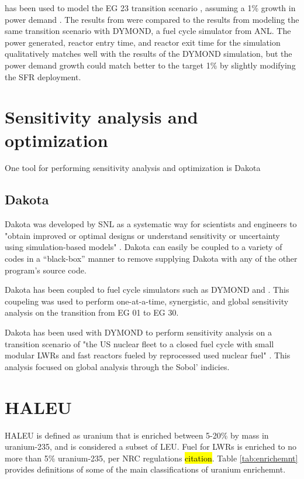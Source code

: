 \Cyclus has been used to model the EG 23 transition scenario 
\cite{wigeland_nuclear_2014}, assuming a 1\% growth in power demand 
\cite{djokic_application_2015}. The results from \Cyclus were compared 
to the results from modeling the same transition scenario with DYMOND, 
a fuel cycle simulator from \gls{ANL}. The power generated, reactor entry 
time, and reactor exit time for the \Cyclus simulation qualitatively 
matches well with the results of the DYMOND simulation, but the power 
demand growth could match better to the target 1\% by slightly modifying 
the \gls{SFR} deployment. 

\section{Sensitivity analysis and optimization}

One tool for performing sensitivity analysis and optimization is 
Dakota \cite{adams_dakota_2019}

\subsection{Dakota}
Dakota was developed by \gls{SNL} as a systematic way for scientists and 
engineers to "obtain improved or optimal designs or understand sensitivity
or uncertainty using simulation-based models" \cite{adams_dakota_2019}.
Dakota can easily be coupled to a variety of codes in a ``black-box'' manner
to remove supplying Dakota with any of the other program's source code. 

Dakota has been coupled to fuel cycle simulators such as DYMOND and \Cyclus 
\cite{chee_sensitivity_2019}. This coupeling was used to perform one-at-a-time, 
synergistic, and global sensitivity analysis on the transition from \gls{EG} 01
to \gls{EG} 30. 

Dakota has been used with DYMOND to perform sensitivity analysis on a transition
scenario of "the US nuclear fleet to a closed fuel cycle with small modular 
\glspl{LWR} and fast reactors fueled by reprocessed used nuclear fuel" 
\cite{richards_application_2021}. This analysis focused on global analysis 
through the Sobol' indicies. 


\section{HALEU}
\gls{HALEU} is defined as uranium that is enriched between 5-20\% by mass in 
uranium-235, and is considered a subset of \gls{LEU}. Fuel for \glspl{LWR} 
is enriched to no more than 5\% uranium-235, per \gls{NRC} regulations 
\hl{citation}. Table \ref{tab:enrichemnt} provides definitions of some of the 
main classifications of uranium enrichemnt. 


